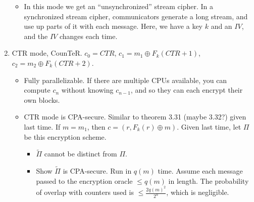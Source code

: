 \documentclass[12pt]{article}
\newcommand{\xor}{\oplus}
\newcommand{\Pit}{\widetilde{\Pi}}
\begin{document}
\begin{enumerate}
\begin{itemize}
\item In this mode we get an ``unsynchronized'' stream cipher. In a synchronized stream cipher, communicators generate a long stream, and use up parts of it with each message. Here, we have a key $k$ and an $IV$, and the $IV$ changes each time.

\end{itemize}

\item CTR mode, CounTeR. $c_0=CTR$, $c_1=m_1\xor F_k(CTR+1)$, $c_2=m_2\xor F_k(CTR+2)$. \begin{itemize}

\item Fully parallelizable. If there are multiple CPUs available, you can compute $c_n$ without knowing $c_{n-1}$, and so they can each encrypt their own blocks.

\item CTR mode is CPA-secure. Similar to theorem 3.31 (maybe 3.32?) given last time. If $m=m_1$, then $c=(r,F_k(r)\xor m)$. Given last time, let $\Pi$ be this encryption scheme.\begin{itemize}

\item $\Pit$ cannot be distinct from $\Pi$.

\item Show $\Pit$ is CPA-secure. Run in $q(m)$ time. Assume each message passed to the encryption oracle $\leq q(m)$ in length. The probability of overlap with counters used is $\leq\frac{2q(m)^2}{2^n}$, which is negligible.

\end{itemize}

\end{itemize}

\end{enumerate}
\end{document}
